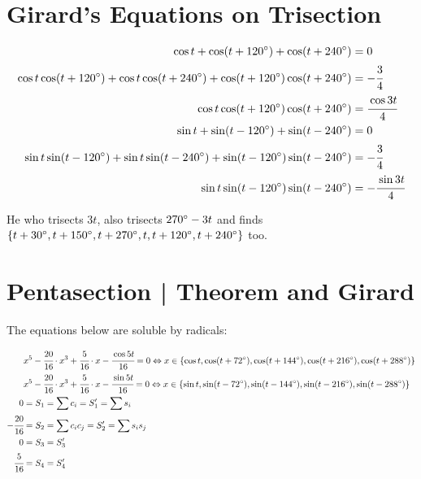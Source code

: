 \documentclass[11pt,a4paper]{article}
\begin{document}
\section{Girard's Equations on Trisection}

\begin{align}
\cos t + \cos (t + 120\degree) + \cos (t + 240\degree) &= 0 \\
\cos t \cos (t + 120\degree) + \cos t \cos (t + 240\degree) + \cos (t + 120\degree) \cos (t + 240\degree) &= - \cfrac{3}{4} \\
\cos t \cos (t + 120\degree) \cos (t + 240\degree) &= \cfrac{\cos 3t}{4} \\
\sin t + \sin (t - 120\degree) + \sin (t - 240\degree) &= 0 \\
\sin t \sin (t - 120\degree) + \sin t \sin (t - 240\degree) + \sin (t - 120\degree) \sin (t - 240\degree) &= - \cfrac{3}{4} \\
\sin t \sin (t - 120\degree) \sin (t - 240\degree) &= - \cfrac{\sin 3t}{4}
\end{align}

\vspace{3mm}

He who trisects $3t$, also trisects $270\degree - 3t$ and finds $\{ t + 30\degree, t + 150\degree, t + 270\degree, t, t + 120\degree, t + 240\degree \}$ too.

\section{Pentasection | Theorem and Girard}

The equations below are soluble by radicals:

\begin{align}
&x^5 - \cfrac{20}{16} \cdot x^3 + \cfrac{5}{16} \cdot x - \cfrac{\cos 5t}{16} = 0 \Leftrightarrow x \in \{ \cos t, \cos (t + 72\degree), \cos (t + 144\degree), \cos (t + 216\degree), \cos (t + 288\degree) \} \\
&x^5 - \cfrac{20}{16} \cdot x^3 + \cfrac{5}{16} \cdot x - \cfrac{\sin 5t}{16} = 0 \Leftrightarrow x \in \{ \sin t, \sin (t - 72\degree), \sin (t - 144\degree), \sin (t - 216\degree), \sin (t - 288\degree) \} \\
0 &= S_1 = \sum c_i = S_1' = \sum s_i \\
- \cfrac{20}{16} &= S_2 = \sum c_i c_j = S_2' = \sum s_i s_j \\
0 &= S_3 = S_3' \\
\cfrac{5}{16} &= S_4 = S_4'
\end{align}
\end{document}

